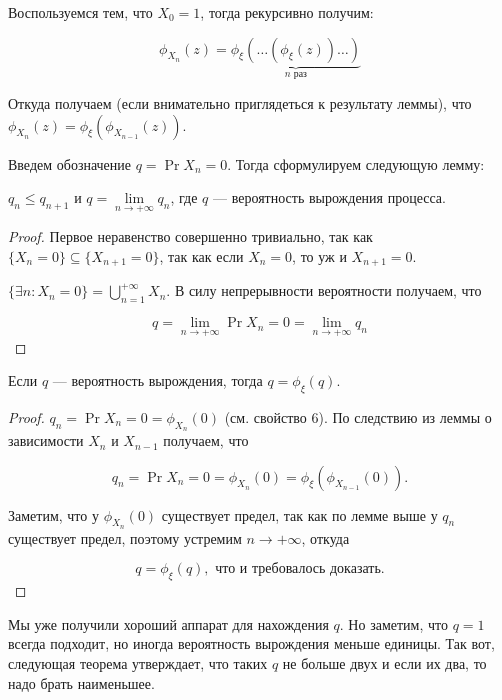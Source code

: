 \begin{consequence}
  Воспользуемся тем, что $X_0 = 1$, тогда рекурсивно получим:

  \[
    \phi_{X_n}(z) = \underbrace{\phi_{\xi}(\ldots(\phi_{\xi}(z))\ldots)}_{n \text{ раз}}
  \]

  Откуда получаем (если внимательно приглядеться к результату леммы),
  что $\phi_{X_n}(z) = \phi_{\xi}(\phi_{X_{n - 1}}(z))$.
\end{consequence}

Введем обозначение $q = \Pr{X_n = 0}$. Тогда сформулируем следующую лемму:

\begin{lemma}
  $q_n \leq q_{n + 1}$ и $q = \lim\limits_{n \to +\infty} q_n$, где $q$ --- вероятность
  вырождения процесса.
\end{lemma}

\begin{proof}
  Первое неравенство совершенно тривиально, так как $\{X_n = 0\} \subseteq 
  \{X_{n + 1} = 0\}$, так как если $X_n = 0$, то уж и $X_{n + 1} = 0$.

  $\{\exists n: X_n = 0\} = \bigcup\limits_{n = 1}^{+\infty} X_n$. В силу
  непрерывности вероятности получаем, что

  \[
    q = \lim\limits_{n \to +\infty} \Pr{X_n = 0} = \lim\limits_{n \to +\infty}
    q_n
  \]
\end{proof}

\begin{theorem}
  Если $q$ --- вероятность вырождения, тогда $q = \phi_{\xi}(q)$.
\end{theorem}

\begin{proof}
  $q_n = \Pr{X_n = 0} = \phi_{X_n}(0)$ (см. свойство 6). По следствию
  из леммы о зависимости $X_n$ и $X_{n - 1}$ получаем, что

  \[
    q_n = \Pr{X_n = 0} = \phi_{X_n}(0) = \phi_{\xi}(\phi_{X_{n - 1}}(0)).
  \]

  Заметим, что у $\phi_{X_n}(0)$ существует предел, так как по лемме выше у
  $q_n$ существует предел, поэтому устремим $n \to +\infty$, откуда

  \[
    q = \phi_{\xi}(q), \text{ что и требовалось доказать.}
  \]
\end{proof}

Мы уже получили хороший аппарат для нахождения $q$. Но заметим, что $q = 1$
всегда подходит, но иногда вероятность вырождения меньше единицы. Так вот, следующая
теорема утверждает, что таких $q$ не больше двух и если их два, то надо брать
наименьшее.

